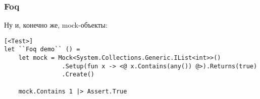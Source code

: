 \documentclass[xetex,mathserif,serif]{beamer}
\begin{document}
	\begin{frame}[fragile]
		\frametitle{Foq}
		Ну и, конечно же, mock-объекты:
		\begin{verbatim}
[<Test>]
let ``Foq demo`` () =
    let mock = Mock<System.Collections.Generic.IList<int>>()
                .Setup(fun x -> <@ x.Contains(any()) @>).Returns(true)
                .Create()

    mock.Contains 1 |> Assert.True
		\end{verbatim}
\end{frame}
\end{document}
